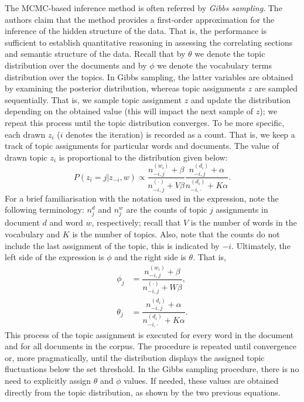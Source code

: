 \documentclass{mprop}
\begin{document}
\par The MCMC-based inference method is often referred by \textit{Gibbs sampling}. The authors claim that the method provides a first-order approximation for the inference of the hidden structure of the data. That is, the performance is sufficient to establish quantitative reasoning in assessing the correlating sections and semantic structure of the data. Recall that by $\theta$ we denote the topic distribution over the documents and by $\phi$ we denote the vocabulary terms distribution over the topics. In Gibbs sampling, the latter variables are obtained by examining the posterior distribution, whereas topic assignments $z$ are sampled sequentially. That is, we sample topic assignment $z$ and update the distribution depending on the obtained value (this will impact the next sample of $z$); we repeat this process until the topic distribution converges. To be more specific, each drawn $z_i$ ($i$ denotes the iteration) is recorded as a count. That is, we keep a track of topic assignments for particular words and documents. The value of drawn topic $z_i$ is proportional to the distribution given below:
\begin{equation}
P(z_i = j | z_{-i}, w) \propto \dfrac{n_{-i, j}^{(w_i)} + \beta}{n_{-i, j}^{(\cdot)} + V\beta}\dfrac{n_{-i, j}^{(d_i)} + \alpha}{n_{-i, \cdot}^{(d_i)} + K\alpha}.
\end{equation}
For a brief familiarisation with the notation used in the expression, note the following terminology: $n_j^{d}$ and $n_j^{w}$ are the counts of topic $j$ assignments in document $d$ and word $w$, respectively; recall that $V$ is the number of words in the vocabulary and $K$ is the number of topics. Also, note that the counts do not include the last assignment of the topic, this is indicated by $-i$. Ultimately, the left side of the expression is $\phi$ and the right side is $\theta$. That is, 
\begin{align}
\phi_j &= \dfrac{n_{-i, j}^{(w_i)} + \beta}{n_{-i, j}^{(\cdot)} + W\beta},\\
\theta_j &= \dfrac{n_{-i, j}^{(d_i)} + \alpha}{n_{-i, \cdot}^{(d_i)} + K\alpha}.
\end{align}
This process of the topic assignment is executed for every word in the document and for all documents in the corpus. The procedure is repeated until convergence or, more pragmatically, until the distribution displays the assigned topic fluctuations below the set threshold. In the Gibbs sampling procedure, there is no need to explicitly assign $\theta$ and $\phi$ values. If needed, these values are obtained directly from the topic distribution, as shown by the two previous equations.
\end{document}

